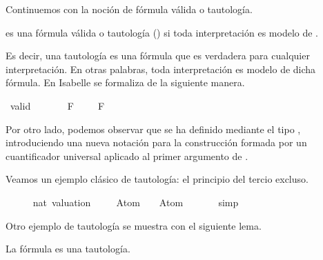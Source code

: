 \begin{isabellebody}
\begin{isamarkuptext}
  Continuemos con la noción de fórmula válida o tautología.

  \begin{definicion} 
   es una fórmula válida o tautología () si toda interpretación 
  es modelo de . 
  \end{definicion}

  Es decir, una tautología es una fórmula que es verdadera para 
  cualquier interpretación. En otras palabras, toda interpretación es
  modelo de dicha fórmula. En Isabelle se formaliza de la siguiente
  manera.%
\end{isamarkuptext}\isamarkuptrue%
\isamarkupfalse%
\ valid\ {\isacharparenleft}{\isachardoublequoteopen}{\isasymTurnstile}\ {\isacharunderscore}{\isachardoublequoteclose}\ {}{}{\isacharparenright}\ \isanewline
\ \ {\isachardoublequoteopen}{\isasymTurnstile}\ F\ {\isasymequiv}\ {\isasymforall}{\isasymA}{\isachardot}\ {\isasymA}\ {\isasymTurnstile}\ F{\isachardoublequoteclose}%
\begin{isamarkuptext}%
Por otro lado, podemos observar que se ha definido mediante el 
  tipo , introduciendo una nueva notación para la 
  construcción formada por un cuantificador universal aplicado 
  al primer argumento de .

  Veamos un ejemplo clásico de tautología: el principio del tercio
  excluso.%
\end{isamarkuptext}\isamarkuptrue%
\isamarkupfalse%
\isanewline
{}\isanewline
%
\isadelimproof
\ \ %
\endisadelimproof
%
\isatagproof
{}\isamarkupfalse%
\ {\isasymA}\ {\isacharcolon}{\isacharcolon}\ {\isachardoublequoteopen}nat\ valuation{\isachardoublequoteclose}\isanewline
\isanewline
\ \ \isamarkupfalse%
\ {\isachardoublequoteopen}{\isasymTurnstile}\ {\isacharparenleft}Atom\ {}\ \isactrlbold {\isasymor}\ {\isacharparenleft}\isactrlbold {\isasymnot}\ {\isacharparenleft}Atom\ {}{\isacharparenright}{\isacharparenright}{\isacharparenright}{\isachardoublequoteclose}\isanewline
\ \ \ \ \isamarkupfalse%
\ simp%
\endisatagproof
{\isafoldproof}%
%
\isadelimproof
\isanewline
%
\endisadelimproof
\isanewline
{}\isamarkupfalse%
%
\begin{isamarkuptext}%
Otro ejemplo de tautología se muestra con el siguiente lema.

  \begin{lema}
    La fórmula \isa{{\isasymtop}} es una tautología.
  \end{lema}
 

\end{isamarkuptext}
\end{isabellebody}
